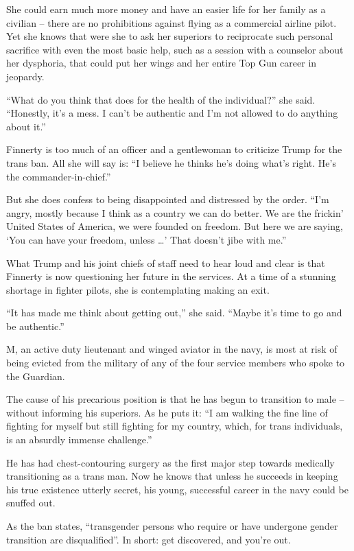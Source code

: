 She could earn much more money and have an easier life for her family as a civilian – there are no prohibitions against flying as a commercial airline pilot. Yet she knows that were she to ask her superiors to reciprocate such personal sacrifice with even the most basic help, such as a session with a counselor about her dysphoria, that could put her wings and her entire Top Gun career in jeopardy.

“What do you think that does for the health of the individual?” she said. “Honestly, it’s a mess. I can’t be authentic and I’m not allowed to do anything about it.”

Finnerty is too much of an officer and a gentlewoman to criticize Trump for the trans ban. All she will say is: “I believe he thinks he’s doing what’s right. He’s the commander-in-chief.”

But she does confess to being disappointed and distressed by the order. “I’m angry, mostly because I think as a country we can do better. We are the frickin’ United States of America, we were founded on freedom. But here we are saying, ‘You can have your freedom, unless …’ That doesn’t jibe with me.”

What Trump and his joint chiefs of staff need to hear loud and clear is that Finnerty is now questioning her future in the services. At a time of a stunning shortage in fighter pilots, she is contemplating making an exit.

“It has made me think about getting out,” she said. “Maybe it’s time to go and be authentic.”

M, an active duty lieutenant and winged aviator in the navy, is most at risk of being evicted from the military of any of the four service members who spoke to the Guardian.

The cause of his precarious position is that he has begun to transition to male – without informing his superiors. As he puts it: “I am walking the fine line of fighting for myself but still fighting for my country, which, for trans individuals, is an absurdly immense challenge.”

He has had chest-contouring surgery as the first major step towards medically transitioning as a trans man. Now he knows that unless he succeeds in keeping his true existence utterly secret, his young, successful career in the navy could be snuffed out.

As the ban states, “transgender persons who require or have undergone gender transition are disqualified”. In short: get discovered, and you’re out.

